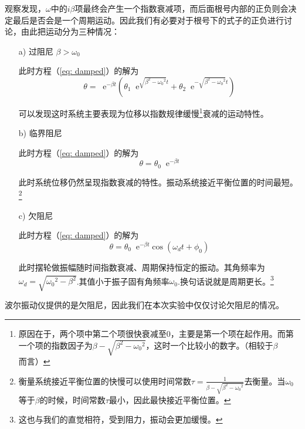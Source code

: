 \documentclass[a4paper,11pt]{article}
\newcommand*{\e}{\mathop{}\!\mathrm{e}}
\begin{document}
        观察发现，$\omega$中的$i\beta$项最终会产生一个指数衰减项，而后面根号内部的正负则会决定最后是否会是一个周期运动。因此我们有必要对于根号下的式子的正负进行讨论，由此把运动分为三种情况：
        \begin{enumerate}
            \item [a)] 过阻尼 $\beta > \omega_0$
            
            此时方程（\ref{eq: damped}）的解为
            \begin{equation}
                \theta = \e^{-\beta t}(\theta_1 \e^{\sqrt{\beta^2-{\omega_0}^2}t}+\theta_2\e^{-\sqrt{\beta^2-{\omega_0}^2}t})
            \end{equation}

            可以发现这时系统主要表现为位移以指数规律缓慢\footnote{原因在于，两个项中第二个项很快衰减至0，主要是第一个项在起作用。而第一个项的指数因子为$\beta-\sqrt{\beta^2-{\omega_0}^2}$，这时一个比较小的数字。（相较于$\beta$而言）}衰减的运动特性。
            
            \item [b)] 临界阻尼
            
            此时方程（\ref{eq: damped}）的解为
            \begin{equation}
                \theta = \theta_0 \e^{-\beta t}
            \end{equation}

            此时系统位移仍然呈现指数衰减的特性。振动系统接近平衡位置的时间最短。\footnote{衡量系统接近平衡位置的快慢可以使用时间常数$\tau = \frac{1}{\beta-\sqrt{\beta^2-{\omega_0}^2}}$去衡量。当$\omega_0$等于$\beta$的时候，时间常数$\tau$最小，因此最快接近平衡位置。}

            \item [c)] 欠阻尼
            
            此时方程（\ref{eq: damped}）的解为
            \begin{equation}
                \theta = \theta_0 \e^{-\beta t}\cos(\omega_d t + \phi_0)
                \label{eq: underdamping angle expression}
            \end{equation}

            此时摆轮做振幅随时间指数衰减、周期保持恒定的振动。其角频率为$\omega_d=\sqrt{{\omega_0}^2-\beta^2}$.其值小于振子固有角频率$\omega_0$.换句话说就是周期更长。\footnote{这也与我们的直觉相符，受到阻力，振动会更加缓慢。}
        \end{enumerate}

        波尔振动仪提供的是欠阻尼，因此我们在本次实验中仅仅讨论欠阻尼的情况。
\end{document}
